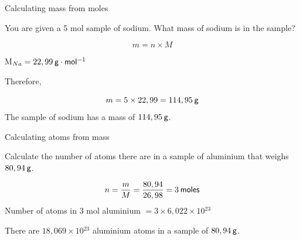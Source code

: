     \noindent
\label{m38717*secfhsst!!!underscore!!!id451}\vspace{.5cm} 
      \noindent
      \begin{wex}{Calculating mass from moles }{
\label{m38717*probfhsst!!!underscore!!!id452}
      \label{m38717*id277751}You are given a 5 mol sample of sodium. What mass of sodium is in the sample?\par }
{
      \label{m38717*id277797}\nopagebreak\noindent{}
        
    \begin{equation}
    m=n\ensuremath{\times}M
      \end{equation}
      \item  
      \label{m38717*id277822}M${}_{Na}=22,99\phantom{\rule{2pt}{0ex}}\mathsf{g}\ensuremath{\cdot}\mathsf{mol}{}^{-1}$\par 
      \label{m38717*id277857}Therefore,\par 
      \label{m38717*id277862}\nopagebreak\noindent{}
    \begin{equation}
    m=5\ensuremath{\times}22,99=114,95\phantom{\rule{2pt}{0ex}}\mathsf{g}
      \end{equation}
      \label{m38717*id277898}The sample of sodium has a mass of  $114,95\phantom{\rule{2pt}{0ex}}\mathsf{g}$.\par 
}
    \end{wex}
    \noindent
\label{m38717*secfhsst!!!underscore!!!id494}\vspace{.5cm} 
      \noindent
      \begin{wex}{Calculating atoms from mass }{
\label{m38717*probfhsst!!!underscore!!!id495}
      \label{m38717*id277914}Calculate the number of atoms there are in a sample of aluminium that weighs $80,94\phantom{\rule{2pt}{0ex}}\mathsf{g}$.\par 
      \vspace{5pt}}
{
      \label{m38717*id277959}\nopagebreak\noindent{}
        
    \begin{equation}
    n=\frac{m}{M}=\frac{80,94}{26,98}=3\phantom{\rule{2pt}{0ex}}\mathsf{moles}
      \end{equation}
      \label{m38717*id278019}Number of atoms in 3 mol aluminium $=3\ensuremath{\times}6,022\ensuremath{\times}10{}^{23}$\par 
      \label{m38717*id278053}There are $18,069\ensuremath{\times}10{}^{23}$ aluminium atoms in a sample of $80,94\phantom{\rule{2pt}{0ex}}\mathsf{g}$.\par 
}
    \end{wex}
